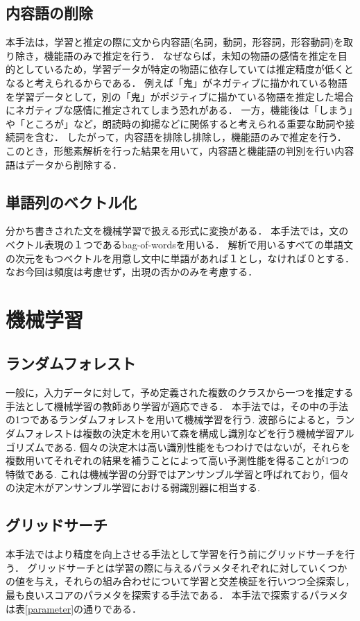 \subsection{内容語の削除}
本手法は，学習と推定の際に文から内容語(名詞，動詞，形容詞，形容動詞)を取り除き，機能語のみで推定を行う．
なぜならば，未知の物語の感情を推定を目的としているため，学習データが特定の物語に依存していては推定精度が低くとなると考えられるからである．
例えば「鬼」がネガティブに描かれている物語を学習データとして，別の「鬼」がポジティブに描かている物語を推定した場合にネガティブな感情に推定されてしまう恐れがある．
一方，機能後は「しまう」や「ところが」など，朗読時の抑揚などに関係すると考えられる重要な助詞や接続詞を含む．
したがって，内容語を排除し排除し，機能語のみで推定を行う．
このとき，形態素解析を行った結果を用いて，内容語と機能語の判別を行い内容語はデータから削除する．

\subsection{単語列のベクトル化}
分かち書きされた文を機械学習で扱える形式に変換がある．
本手法では，文のベクトル表現の１つであるbag-of-wordsを用いる．
解析で用いるすべての単語文の次元をもつベクトルを用意し文中に単語があれば１とし，なければ０とする．
なお今回は頻度は考慮せず，出現の否かのみを考慮する．

\section{機械学習}
\subsection{ランダムフォレスト}
一般に，入力データに対して，予め定義された複数のクラスから一つを推定する手法として機械学習の教師あり学習が適応できる．
本手法では，その中の手法の1つであるランダムフォレストを用いて機械学習を行う.
波部ら\cite{habe}によると，ランダムフォレストは複数の決定木を用いて森を構成し識別などを行う機械学習アルゴリズムである.
個々の決定木は高い識別性能をもつわけではないが，それらを複数用いてそれぞれの結果を補うことによって高い予測性能を得ることが1つの特徴である.
これは機械学習の分野ではアンサンブル学習と呼ばれており，個々の決定木がアンサンブル学習における弱識別器に相当する.


\subsection{グリッドサーチ}
本手法ではより精度を向上させる手法として学習を行う前にグリッドサーチを行う．
グリッドサーチとは学習の際に与えるパラメタそれぞれに対していくつかの値を与え，それらの組み合わせについて学習と交差検証を行いつつ全探索し，最も良いスコアのパラメタを探索する手法である．
本手法で探索するパラメタは表\ref{parameter}の通りである．

